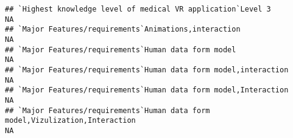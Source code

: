 \documentclass[]{article}
\begin{document}
\begin{verbatim}
## `Highest knowledge level of medical VR application`Level 3                                                                                                                                                                                                                                                                                                                                                                                                                            NA
## `Major Features/requirements`Animations,interaction                                                                                                                                                                                                                                                                                                                                                                                                                                   NA
## `Major Features/requirements`Human data form model                                                                                                                                                                                                                                                                                                                                                                                                                                    NA
## `Major Features/requirements`Human data form model,interaction                                                                                                                                                                                                                                                                                                                                                                                                                        NA
## `Major Features/requirements`Human data form model,Interaction                                                                                                                                                                                                                                                                                                                                                                                                                        NA
## `Major Features/requirements`Human data form model,Vizulization,Interaction                                                                                                                                                                                                                                                                                                                                                                                                           NA

\end{verbatim}
\end{document}

